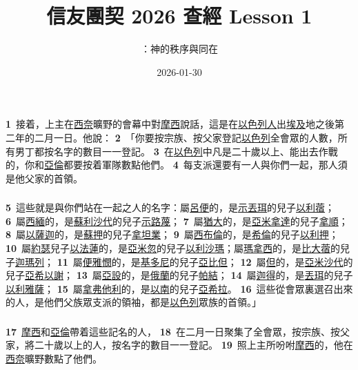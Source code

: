 \documentclass{beamer}
\title{信友團契 2026 查經 Lesson 1}
\subtitle{\bibleref{Nb 1:1-18}：神的秩序與同在}
\date{2026-01-30}
\begin{document}
\begin{frame}
  \titlepage
\end{frame}

\begin{frame}
  \frametitle{}
  \textbf{1}\ 接着，上主在\uline{西奈}曠野的會幕中對\uline{摩西}說話，這是在\uline{以色列人}出\uline{埃及}地之後第二年的二月一日。他說：
  \textbf{2}\ 「你要按宗族、按父家登記\uline{以色列}全會眾的人數，所有男丁都按名字的數目一一登記。
  \textbf{3}\ 在\uline{以色列}中凡是二十歲以上、能出去作戰的，你和\uline{亞倫}都要按着軍隊數點他們。
  \textbf{4}\ 每支派還要有一人與你們一起，那人須是他父家的首領。
\end{frame}

\begin{frame}
  \frametitle{}
  \textbf{5}\ 這些就是與你們站在一起之人的名字：屬\uline{呂便}的，是\uline{示丟珥}的兒子\uline{以利蓿}；
  \textbf{6}\ 屬\uline{西緬}的，是\uline{蘇利沙代}的兒子\uline{示路蔑}；
  \textbf{7}\ 屬\uline{猶大}的，是\uline{亞米拿達}的兒子\uline{拿順}；
  \textbf{8}\ 屬\uline{以薩迦}的，是\uline{蘇押}的兒子\uline{拿坦業}；
  \textbf{9}\ 屬\uline{西布倫}的，是\uline{希倫}的兒子\uline{以利押}；
  \textbf{10}\ 屬\uline{約瑟}兒子\uline{以法蓮}的，是\uline{亞米忽}的兒子\uline{以利沙瑪}；屬\uline{瑪拿西}的，是\uline{比大蓿}的兒子\uline{迦瑪列}；
  \textbf{11}\ 屬\uline{便雅憫}的，是\uline{基多尼}的兒子\uline{亞比但}；
  \textbf{12}\ 屬\uline{但}的，是\uline{亞米沙代}的兒子\uline{亞希以謝}；
  \textbf{13}\ 屬\uline{亞設}的，是\uline{俄蘭}的兒子\uline{帕結}；
  \textbf{14}\ 屬\uline{迦得}的，是\uline{丟珥}的兒子\uline{以利雅薩}；
  \textbf{15}\ 屬\uline{拿弗他利}的，是\uline{以南}的兒子\uline{亞希拉}。
  \textbf{16}\ 這些從會眾裏選召出來的人，是他們父族眾支派的領袖，都是\uline{以色列}眾族的首領。」
\end{frame}

\begin{frame}
  \frametitle{}
  \textbf{17}\ \uline{摩西}和\uline{亞倫}帶着這些記名的人，
  \textbf{18}\ 在二月一日聚集了全會眾，按宗族、按父家，將二十歲以上的人，按名字的數目一一登記。
  \textbf{19}\ 照上主所吩咐\uline{摩西}的，他在\uline{西奈}曠野數點了他們。
\end{frame}
\end{document}

